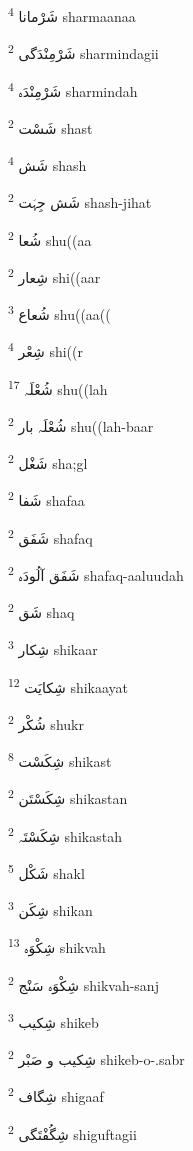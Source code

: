 \documentclass[12pt]{article}
\begin{document}
\begin{RTL}
\begin{multicols}{5}
{\ur شَرْمانا}   \textsuperscript{4} sharmaanaa

{\ur شَرْمِنْدَگی}   \textsuperscript{2} sharmindagii

{\ur شَرْمِنْدَہ}   \textsuperscript{4} sharmindah

{\ur شَسْت}   \textsuperscript{2} shast

{\ur شَش}   \textsuperscript{4} shash

{\ur شَش جِہَت}   \textsuperscript{2} shash-jihat

{\ur شُعا}   \textsuperscript{2} shu((aa

{\ur شِعار}   \textsuperscript{2} shi((aar

{\ur شُعاع}   \textsuperscript{3} shu((aa((

{\ur شِعْر}   \textsuperscript{4} shi((r

{\ur شُعْلَہ}   \textsuperscript{17} shu((lah

{\ur شُعْلَہ بار}   \textsuperscript{2} shu((lah-baar

{\ur شَغْل}   \textsuperscript{2} sha;gl

{\ur شَفا}   \textsuperscript{2} shafaa

{\ur شَفَق}   \textsuperscript{2} shafaq

{\ur شَفَق آلُودَہ}   \textsuperscript{2} shafaq-aaluudah

{\ur شَق}   \textsuperscript{2} shaq

{\ur شِکار}   \textsuperscript{3} shikaar

{\ur شِکایَت}   \textsuperscript{12} shikaayat

{\ur شُکْر}   \textsuperscript{2} shukr

{\ur شِکَسْت}   \textsuperscript{8} shikast

{\ur شِکَسْتَن}   \textsuperscript{2} shikastan

{\ur شِکَسْتَہ}   \textsuperscript{2} shikastah

{\ur شَکْل}   \textsuperscript{5} shakl

{\ur شِکَن}   \textsuperscript{3} shikan

{\ur شِکْوَہ}   \textsuperscript{13} shikvah

{\ur شِکْوَہ سَنْج}   \textsuperscript{2} shikvah-sanj

{\ur شِکیب}   \textsuperscript{3} shikeb

{\ur شِکیب و صَبْر}   \textsuperscript{2} shikeb-o-.sabr

{\ur شِگاف}   \textsuperscript{2} shigaaf

{\ur شِگُفْتَگی}   \textsuperscript{2} shiguftagii


\end{multicols}
\end{RTL}
\end{document}
